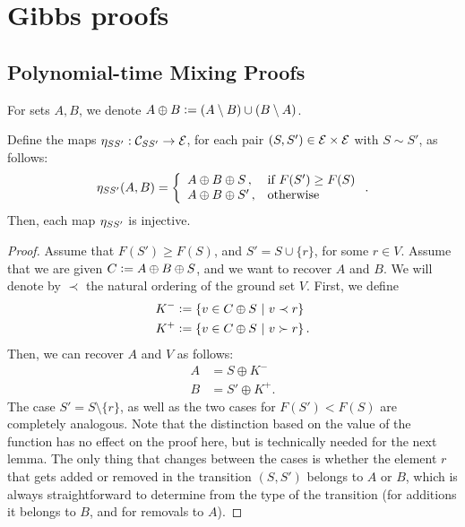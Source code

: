 \chapter{Gibbs proofs}

\section{Polynomial-time Mixing Proofs}
For sets $A, B$, we denote $A \oplus B \defeq (A \setminus B)\cup(B \setminus A)$.

\let\oldthelemma\thelemma
\renewcommand{\thelemma}{A.1}
\begin{lemma} \label{lem:inj}
Define the maps $\ess : \mathcal{C}_{SS'} \to \ss$, for each pair $(S, S') \in \ss \times \ss$ with $S \sim S'$, as follows:
\begin{align*}
  \ess(A, B) = \twopartdefo{A \oplus B \oplus S}{F(S') \geq F(S)}{A \oplus B \oplus S'}.
\end{align*}
Then, each map $\ess$ is injective.
\end{lemma}

\begin{proof}
  Assume that $F(S') \geq F(S)$, and $S' = S \cup \{r\}$, for some $r \in V$.
  Assume that we are given $C \defeq A \oplus B \oplus S$, and we want to recover $A$ and $B$.
  We will denote by $\prec$ the natural ordering of the ground set $V$.
  First, we define
  \begin{align*}
    K^- &\defeq \sdef{v \in C \oplus S}{v \prec r}\\
    K^+ &\defeq \sdef{v \in C \oplus S}{v \succ r}.
  \end{align*}
  Then, we can recover $A$ and $V$ as follows:
  \begin{align*}
    A &= S \oplus K^-\\
    B &= S' \oplus K^+.
  \end{align*}
  The case $S' = S \setminus \{r\}$, as well as the two cases for $F(S') < F(S)$ are completely analogous.
  Note that the distinction based on the value of the function has no effect on the proof here, but is technically needed for the next lemma.
  The only thing that changes between the cases is whether the element $r$ that gets added or removed in the transition $(S, S')$ belongs to $A$ or $B$, which is always straightforward to determine from the type of the transition (for additions it belongs to $B$, and for removals to $A$).
\end{proof}
\let\thelemma\oldthelemma

